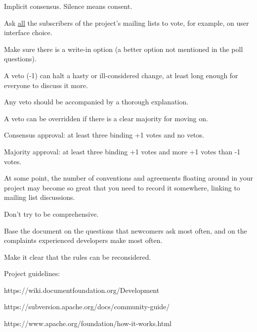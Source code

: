 \documentclass[landscape,30pt]{foils}
\begin{document}
Implicit consensus. Silence means consent.


Ask \underline{all} the subscribers of the project's mailing lists to vote, for example, on user interface choice.

Make sure there is a write-in option (a better option not mentioned in the poll questions). 


A veto (-1) can halt a hasty or ill-considered change, at least long enough for everyone to discuss it more.

Any veto should be accompanied by a thorough explanation.

A veto can be overridden if there is a clear majority for moving on.


Consensus approval: at least three binding +1 votes and no vetos.

Majority approval: at least three binding +1 votes and more +1 votes than -1 votes.


At some point, the number of conventions and agreements floating around in your project may become
so great that you need to record it somewhere, linking to mailing list discussions.

Don't try to be comprehensive.

Base the document on the questions that newcomers ask most often, and on the complaints experienced developers make most often.

Make it clear that the rules can be reconsidered.

Project guidelines:

https://wiki.documentfoundation.org/Development

https://subversion.apache.org/docs/community-guide/

https://www.apache.org/foundation/how-it-works.html




\end{document}
